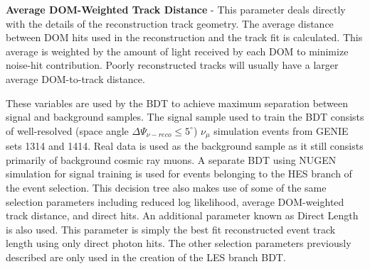 \documentclass{gatech-thesis}
\begin{document}
\begin{adjustwidth}{2.5em}{2.5em}
\textbf{Average DOM-Weighted Track Distance} - This parameter deals directly with the details of the reconstruction track geometry. The average distance between DOM hits used in the reconstruction and the track fit is calculated. This average is weighted by the amount of light received by each DOM to minimize noise-hit contribution. Poorly reconstructed tracks will usually have a larger average DOM-to-track distance.
\end{adjustwidth}
\setlength{\parindent}{17.5pt}
These variables are used by the BDT to achieve maximum separation between signal and background samples. The signal sample used to train the BDT consists of well-resolved (space angle $\Delta \Psi_{\nu-reco} \leq 5^{\circ}$) $\nu_{\mu}$ simulation events from GENIE sets 1314 and 1414. Real data is used as the background sample as it still consists primarily of background cosmic ray muons. A separate BDT using NUGEN simulation for signal training is used for events belonging to the HES branch of the event selection. This decision tree also makes use of some of the same selection parameters including reduced log likelihood, average DOM-weighted track distance, and direct hits. An additional parameter known as Direct Length is also used. This parameter is simply the best fit reconstructed event track length using only direct photon hits. The other selection parameters previously described are only used in the creation of the LES branch BDT.
\end{document}
